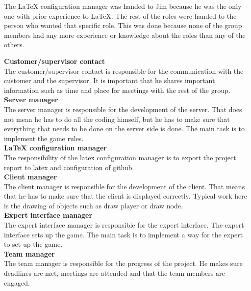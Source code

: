 The LaTeX configuration manager was handed to Jim because he was the only one with prior experience to LaTeX. The rest of the roles were handed to the person who wanted that specific role. This was done because none of the group members had any more experience or knowledge about the roles than any of the others.
\\\newline

\noindent\textbf{Customer/supervisor contact}\\ %
The customer/supervisor contact is responsible for the communication with the 
customer and the supervisor. It is important that he shares important 
information such as time and place for meetings with the rest of the group.
\\\newline
\textbf{Server manager}\\
The server manager is responsible for the development of the server. That does 
not mean he has to do all the coding himself, but he has to make sure that 
everything that needs to be done on the server side is done. The main task is 
to implement the game rules.
\\\newline
\textbf{LaTeX configuration manager}\\
The responsibility of the latex configuration manager is to export the project 
report to latex and configuration of github.
\\\newline
\textbf{Client manager}\\
The client manager is responsible for the development of the client. That means 
that he has to make sure that the client is displayed correctly. Typical work 
here is the drawing of objects such as draw player or draw node. 
\\\newline
\textbf{Expert interface manager}\\
The expert interface manager is responsible for the expert interface. The 
expert interface sets up the game. The main task is to implement a way for the 
expert to set up the game.
\\\newline
\textbf{Team manager}\\
The team manager is responsible for the progress of the project. He makes sure 
deadlines are met, meetings are attended and that the team members are engaged.
\\\newline
